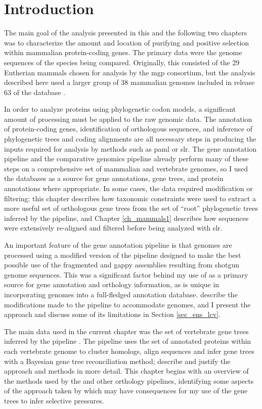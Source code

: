 \section{Introduction}

The main goal of the analysis presented in this and the following two
chapters was to characterize the amount and location of purifying and
positive selection within mammalian protein-coding genes. The primary
data were the genome sequences of the species being
compared. Originally, this consisted of the 29 Eutherian mammals
chosen for analysis by the \ac{mgp} consortium, but the analysis
described here used a larger group of 38 mammalian genomes included in
release 63 of the \ens database \citep{Flicek2011}.

In order to analyze proteins using phylogenetic codon models, a
significant amount of processing must be applied to the raw genomic
data. The annotation of protein-coding genes, identification of
orthologous sequences, and inference of phylogenetic trees and coding
alignments are all necessary steps in producing the inputs required
for analysis by methods such as \acs{paml} or \acs{slr}. The \ens gene
annotation pipeline and the \ens \cmp comparative genomics pipeline
already perform many of these steps on a comprehensive set of
mammalian and vertebrate genomes, so I used the \ens databases as a
source for gene annotations, gene trees, and protein annotations where
appropriate. In some cases, the \ens data required modification or
filtering: this chapter describes how taxonomic constraints were used
to extract a more useful set of orthologous gene trees from the set of
``root'' phylogenetic trees inferred by the \cmp pipeline, and Chapter
\ref{ch_mammals1} describes how sequences were extensively re-aligned
and filtered before being analyzed with \ac{slr}.

An important feature of the \ens gene annotation pipeline is that \lcv
genomes are processed using a modified version of the pipeline
designed to make the best possible use of the fragmented and gappy
assemblies resulting from \lcv shotgun genome sequences. This was a
significant factor behind my use of \ens as a primary source for gene
annotation and orthology information, as \ens is unique in
incorporating \lcv genomes into a full-fledged annotation
database. \citet{Hubbard2007} describe the modifications made to the
\ens pipeline to accommodate \lcv genomes, and I present the approach
and discuss some of its limitations in Section \ref{sec_ens_lcv}.

The main data used in the current chapter was the set of vertebrate
gene trees inferred by the \ens \cmp pipeline \citep{Vilella2009}. The
\cmp pipeline uses the set of annotated proteins within each
vertebrate genome to cluster homologs, align sequences and infer gene
trees with a Bayesian gene tree reconciliation method;
\citet{Vilella2009} describe and justify the approach and methods in
more detail. This chapter begins with an overview of the methods used by
the \cmp and other orthology pipelines, identifying some aspects of
the approach taken by \cmp which may have consequences for my use of
the gene trees to infer \sw selective pressures.

